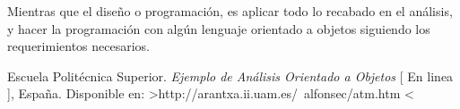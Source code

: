 \documentclass[spanish,12pt,letterpapper]{article}
\begin{document}
	Mientras que el diseño o programación, es aplicar todo lo recabado en el análisis, y hacer la programación con algún lenguaje orientado a objetos siguiendo los requerimientos necesarios.
	
	\pagebreak
	\begin{thebibliography}{9}
		 Escuela Politécnica Superior.
		\emph{Ejemplo de Análisis Orientado a Objetos} {[} En linea {]}, España. Disponible en: \textgreater http://arantxa.ii.uam.es/~alfonsec/atm.htm \textless
	\end{thebibliography}
\end{document}
